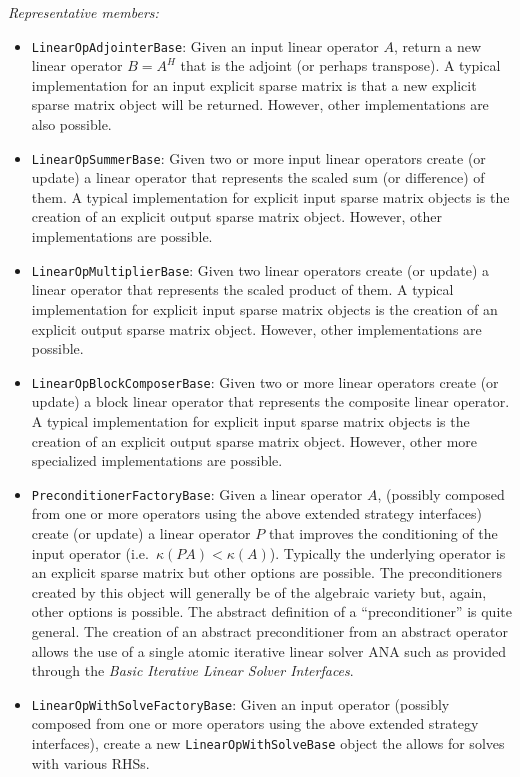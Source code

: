\documentclass[pdf,ps2pdf,11pt]{SANDreport}
\begin{document}
{}\textit{Representative members:}
\begin{itemize}
%
{}\item {}\texttt{LinearOpAdjointerBase}: Given an input linear operator $A$,
return a new linear operator $B = A^H$ that is the adjoint (or perhaps
transpose).  A typical implementation for an input explicit sparse matrix is
that a new explicit sparse matrix object will be returned.  However, other
implementations are also possible.
%
{}\item {}\texttt{LinearOpSummerBase}: Given two or more input linear
operators create (or update) a linear operator that represents the scaled sum
(or difference) of them.  A typical implementation for explicit input sparse
matrix objects is the creation of an explicit output sparse matrix object.
However, other implementations are possible.
%
{}\item {}\texttt{LinearOpMultiplierBase}: Given two linear operators create
(or update) a linear operator that represents the scaled product of them.  A
typical implementation for explicit input sparse matrix objects is the
creation of an explicit output sparse matrix object.  However, other
implementations are possible.
%
{}\item {}\texttt{LinearOpBlockComposerBase}: Given two or more linear
operators create (or update) a block linear operator that represents the
composite linear operator.  A typical implementation for explicit input sparse
matrix objects is the creation of an explicit output sparse matrix object.
However, other more specialized implementations are possible.
%
{}\item {}\texttt{PreconditionerFactoryBase}: Given a linear operator $A$,
(possibly composed from one or more operators using the above extended
strategy interfaces) create (or update) a linear operator $P$ that improves
the conditioning of the input operator (i.e.\ $\kappa(P A) < {}\kappa(A)$).
Typically the underlying operator is an explicit sparse matrix but other
options are possible.  The preconditioners created by this object will
generally be of the algebraic variety but, again, other options is possible.
The abstract definition of a ``preconditioner'' is quite general.  The
creation of an abstract preconditioner from an abstract operator allows the
use of a single atomic iterative linear solver ANA such as provided through
the {}\textit{Basic Iterative Linear Solver Interfaces}.
%
{}\item {}\texttt{LinearOpWithSolveFactoryBase}: Given an input operator
(possibly composed from one or more operators using the above extended
strategy interfaces), create a new {}\texttt{Linear\-Op\-With\-Solve\-Base}
object the allows for solves with various RHSs.
%
\end{itemize}
\end{document}
